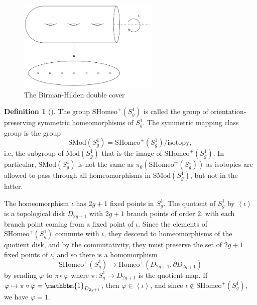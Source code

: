 \documentclass[reqno]{amsart}
\theoremstyle{definition}
\newtheorem{definition}[theorem]{Definition}
\theoremstyle{remark}
\newcommand{\Mod}{{\mathrm{Mod}}}
\newcommand{\SMod}{{\mathrm{SMod}}}
\newcommand{\Homeo}{{\mathrm{Homeo}}}
\newcommand{\SHomeo}{{\mathrm{SHomeo}}}
\begin{document}
 \begin{figure}[H]
     \centering
     \includegraphics[width=0.6\textwidth]{birman-hilden-double-cover.png}
     \caption{The Birman-Hilden double cover}
     \label{fig:birman-hilden-double-cover-png}
 \end{figure}

 \begin{definition}[]
 The group $\SHomeo^{+} \left( S_g^{1} \right) $ is
 called the group of orientation-preserving
 symmetric homeomorphisms of $S_g^{1}$. 
 The symmetric mapping class group is the group
 \[
 \SMod (S_g^{1}) = 
 \SHomeo^{+} \left( S_g^{1} \right) / \text{isotopy},
 \] 
 i.e, the subgroup of $\Mod \left( S_g^{1} \right) $ that
 is the image of $\SHomeo^{+} \left( S_g^{1} \right) $.
 In particular,
 $\SMod \left( S_g^{1} \right) $ is not the same
 as
 $\pi_0 \left( \SHomeo^{+} 
 \left( S_g^{1} \right) \right) $ as isotopies are
 allowed to pass through all homeomorphisms 
 in $\SMod \left( S_g^{1} \right) $, but not
 in the latter.
 \end{definition}

 The homeomorphism $\iota$ has
  $2g+1$ fixed points in
   $S_g^{1}$. The quotient of
   $S_g^{1}$ by $\left<\iota \right>$ is
   a topological disk
   $D_{2g+1}$ with $2g+1$ branch points of order
   $2$, with each branch point coming from a fixed point of $\iota$.
   Since the elements of  $\SHomeo^{+} \left( S_g^{1} \right) $ 
   commute with $\iota$, they descend to homeomorphisms
   of the quotient disk, and by the commutativity, they
   must preserve the set of  $2g+1$ fixed points of $\iota$,
   and so there is a homomorphism
    \[
   \SHomeo^{+} \left( S_g^{1} \right) 
   \to \Homeo^{+} \left( D_{2g+1}, \partial D_{2g+1} \right) 
   \] 
   by sending
   $\varphi $ to
   $\pi \circ \varphi $ where
   $\pi \colon S_g^{1} \to 
   D_{2g+1}$ is the quotient map. If
   $\varphi  \mapsto \pi \circ \varphi  = \mathbbm{1}_{
   D_{2g+1}}$, then $\varphi  
   \in \left<\iota \right>$, and since $\iota 
   \not\in \SHomeo^{+} \left( S_g^{1} \right) $, we have
   $\varphi  = 1$.
   
\end{document}
